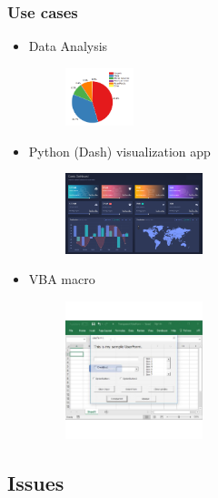 \begin{frame}\frametitle{Use cases}
   \begin{itemize}
      \item Data Analysis
      \begin{minipage}{0.2\linewidth}
         \begin{figure}[H]
            \includegraphics[width=2cm]{../images/illustrations/piechart.png}
         \end{figure}
      \end{minipage}
      \item Python (Dash) visualization app
      \begin{minipage}{0.2\linewidth}
         \begin{figure}[H]
            \includegraphics[width=4cm]{../images/illustrations/dashboard.png}
         \end{figure}
      \end{minipage}
      \item VBA macro
      \begin{minipage}{0.2\linewidth}
         \begin{figure}[H]
            \includegraphics[width=4cm]{../images/illustrations/userform.jpeg}
         \end{figure}
      \end{minipage}
   \end{itemize}
\end{frame}



\subsection{Issues}

